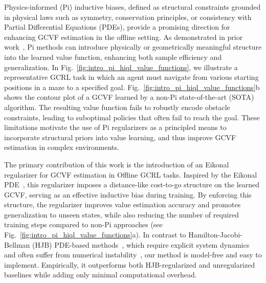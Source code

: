 \documentclass{article}
\theoremstyle{plain}
\theoremstyle{definition}
\theoremstyle{remark}
\begin{document}
Physics-informed (Pi) inductive biases, defined as structural constraints grounded in physical laws such as symmetry, conservation principles, or consistency with Partial Differential Equations (PDEs), provide a promising direction for enhancing GCVF estimation in the offline setting. As demonstrated in prior work~\cite{lienenhancing}, Pi methods can introduce physically or geometrically meaningful structure into the learned value function, enhancing both sample efficiency and generalization. In Fig.~\ref{fig:intro_pi_hiql_value_functions}, we illustrate a representative GCRL task in which an agent must navigate from various starting positions in a maze to a specified goal. Fig.~\ref{fig:intro_pi_hiql_value_functions}b shows the contour plot of a GCVF learned by a non-Pi state-of-the-art (SOTA) algorithm. The resulting value function fails to robustly encode obstacle constraints, leading to suboptimal policies that often fail to reach the goal. These limitations motivate the use of Pi regularizers as a principled means to incorporate structural priors into value learning, and thus improve GCVF estimation in complex environments.

The primary contribution of this work is the introduction of an Eikonal regularizer for GCVF estimation in Offline GCRL tasks. Inspired by the Eikonal PDE~\cite{noack2017acoustic}, this regularizer imposes a distance-like cost-to-go structure on the learned GCVF, serving as an effective inductive bias during training. By enforcing this structure, the regularizer improves value estimation accuracy and promotes generalization to unseen states, while also reducing the number of required training steps compared to non-Pi approaches (see Fig.~\ref{fig:intro_pi_hiql_value_functions}a). In contrast to Hamilton-Jacobi-Bellman (HJB) PDE-based methods~\cite{lienenhancing}, which require explicit system dynamics and often suffer from numerical instability~\cite{munos1997convergent, munos1997reinforcement}, our method is model-free and easy to implement. Empirically, it outperforms both HJB-regularized and unregularized baselines while adding only minimal computational overhead.
\end{document}
